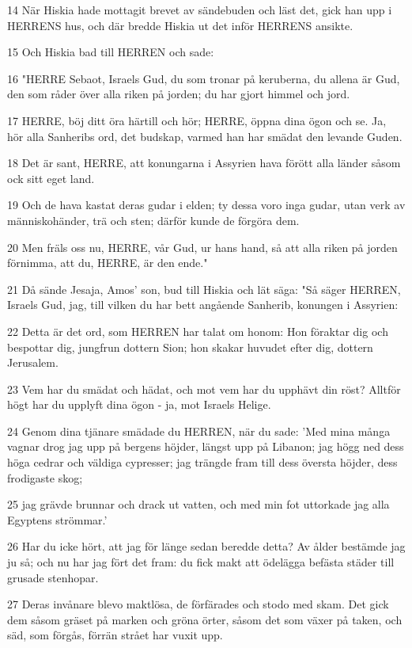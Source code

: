 \par 14 När Hiskia hade mottagit brevet av sändebuden och läst det, gick han upp i HERRENS hus, och där bredde Hiskia ut det inför HERRENS ansikte.
\par 15 Och Hiskia bad till HERREN och sade:
\par 16 "HERRE Sebaot, Israels Gud, du som tronar på keruberna, du allena är Gud, den som råder över alla riken på jorden; du har gjort himmel och jord.
\par 17 HERRE, böj ditt öra härtill och hör; HERRE, öppna dina ögon och se. Ja, hör alla Sanheribs ord, det budskap, varmed han har smädat den levande Guden.
\par 18 Det är sant, HERRE, att konungarna i Assyrien hava förött alla länder såsom ock sitt eget land.
\par 19 Och de hava kastat deras gudar i elden; ty dessa voro inga gudar, utan verk av människohänder, trä och sten; därför kunde de förgöra dem.
\par 20 Men fräls oss nu, HERRE, vår Gud, ur hans hand, så att alla riken på jorden förnimma, att du, HERRE, är den ende."
\par 21 Då sände Jesaja, Amos' son, bud till Hiskia och lät säga: "Så säger HERREN, Israels Gud, jag, till vilken du har bett angående Sanherib, konungen i Assyrien:
\par 22 Detta är det ord, som HERREN har talat om honom: Hon föraktar dig och bespottar dig, jungfrun dottern Sion; hon skakar huvudet efter dig, dottern Jerusalem.
\par 23 Vem har du smädat och hädat, och mot vem har du upphävt din röst? Alltför högt har du upplyft dina ögon - ja, mot Israels Helige.
\par 24 Genom dina tjänare smädade du HERREN, när du sade: 'Med mina många vagnar drog jag upp på bergens höjder, längst upp på Libanon; jag högg ned dess höga cedrar och väldiga cypresser; jag trängde fram till dess översta höjder, dess frodigaste skog;
\par 25 jag grävde brunnar och drack ut vatten, och med min fot uttorkade jag alla Egyptens strömmar.'
\par 26 Har du icke hört, att jag för länge sedan beredde detta? Av ålder bestämde jag ju så; och nu har jag fört det fram: du fick makt att ödelägga befästa städer till grusade stenhopar.
\par 27 Deras invånare blevo maktlösa, de förfärades och stodo med skam. Det gick dem såsom gräset på marken och gröna örter, såsom det som växer på taken, och säd, som förgås, förrän strået har vuxit upp.
